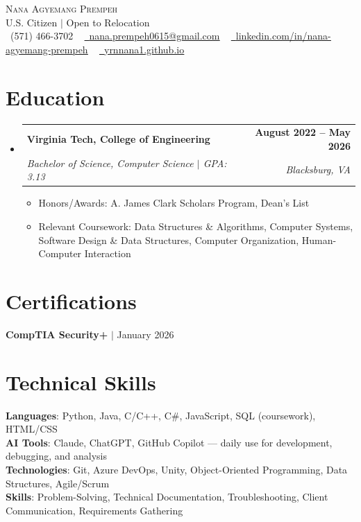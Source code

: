 \documentclass[letterpaper,10.99pt]{article}
\makeatletter
\newcommand{\resumeItem}[1]{
  \item\small{
    {#1 \vspace{-3pt}}
  }
}
\newcommand{\resumeSubheading}[4]{
  \vspace{-2pt}\item
    \begin{tabular*}{1.0\textwidth}[t]{l@{\extracolsep{\fill}}r}
      \textbf{#1} & \textbf{\small #2} \\
      \textit{\small#3} & \textit{\small #4} \\
    \end{tabular*}\vspace{-7pt}
}
\newcommand{\resumeSubHeadingListStart}{\begin{itemize}[leftmargin=0.0in, label={}]}
\newcommand{\resumeSubHeadingListEnd}{\end{itemize}}
\newcommand{\resumeItemListStart}{\begin{itemize}}
\newcommand{\resumeItemListEnd}{\end{itemize}\vspace{-5pt}}
\makeatother
\begin{document}
\begin{center}
    {\Huge \scshape Nana Agyemang Prempeh} \\ \vspace{1pt}
    U.S. Citizen $|$ Open to Relocation \\ \vspace{1pt}
    \small \raisebox{-0.1\height}\faPhone\ (571) 466-3702 ~ \href{mailto:nana.prempeh0615@gmail.com}{\raisebox{-0.2\height}\faEnvelope\  \underline{nana.prempeh0615@gmail.com}} ~
    \href{https://www.linkedin.com/in/nana-agyemang-prempeh}{\raisebox{-0.2\height}\faLinkedin\ \underline{linkedin.com/in/nana-agyemang-prempeh}} ~
    \href{https://yrnnana1.github.io/}{\raisebox{-0.2\height}\faGlobe\ \underline{yrnnana1.github.io}}
    \vspace{-8pt}
\end{center}
\section{Education}
  \resumeSubHeadingListStart
    \resumeSubheading
      {Virginia Tech, College of Engineering}{August 2022 -- May 2026}
      {Bachelor of Science, Computer Science $|$ GPA: 3.13}{Blacksburg, VA}
      \resumeItemListStart
        \resumeItem{Honors/Awards: A. James Clark Scholars Program, Dean's List}
        \resumeItem{Relevant Coursework: Data Structures \& Algorithms, Computer Systems, Software Design \& Data Structures, Computer Organization, Human-Computer Interaction}
      \resumeItemListEnd
  \resumeSubHeadingListEnd
\section{Certifications}
 \begin{itemize}[leftmargin=0.15in, label={}]
    \small{\item{
     \textbf{CompTIA Security+} $|$ January 2026 \\
    }}
 \end{itemize}
 \vspace{-16pt}
\section{Technical Skills}
 \begin{itemize}[leftmargin=0.15in, label={}]
    \small{\item{
     \textbf{Languages}{: Python, Java, C/C++, C\#, JavaScript, SQL (coursework), HTML/CSS} \\
     \textbf{AI Tools}{: Claude, ChatGPT, GitHub Copilot — daily use for development, debugging, and analysis} \\
     \textbf{Technologies}{: Git, Azure DevOps, Unity, Object-Oriented Programming, Data Structures, Agile/Scrum} \\
     \textbf{Skills}{: Problem-Solving, Technical Documentation, Troubleshooting, Client Communication, Requirements Gathering} \\
    }}
 \end{itemize}
 \vspace{-16pt}
\end{document}
